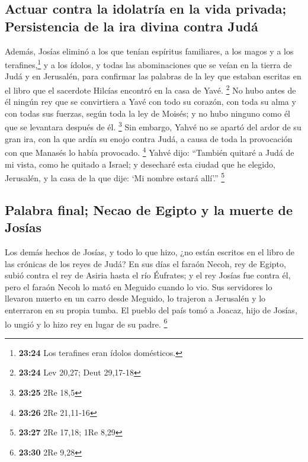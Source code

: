 \hypertarget{actuar-contra-la-idolatruxeda-en-la-vida-privada-persistencia-de-la-ira-divina-contra-juduxe1}{%
\subsection{Actuar contra la idolatría en la vida privada; Persistencia
de la ira divina contra
Judá}\label{actuar-contra-la-idolatruxeda-en-la-vida-privada-persistencia-de-la-ira-divina-contra-juduxe1}}

 Además, Josías eliminó a los que tenían espíritus
familiares, a los magos y a los terafines,\footnote{\textbf{23:24} Los
  terafines eran ídolos domésticos.} y a los ídolos, y todas las
abominaciones que se veían en la tierra de Judá y en Jerusalén, para
confirmar las palabras de la ley que estaban escritas en el libro que el
sacerdote Hilcías encontró en la casa de Yavé. \footnote{\textbf{23:24}
  Lev 20,27; Deut 29,17-18}  No hubo antes de él ningún
rey que se convirtiera a Yavé con todo su corazón, con toda su alma y
con todas sus fuerzas, según toda la ley de Moisés; y no hubo ninguno
como él que se levantara después de él. \footnote{\textbf{23:25} 2Re
  18,5}  Sin embargo, Yahvé no se apartó del ardor de su
gran ira, con la que ardía su enojo contra Judá, a causa de toda la
provocación con que Manasés lo había provocado. \footnote{\textbf{23:26}
  2Re 21,11-16}  Yahvé dijo: ``También quitaré a Judá de
mi vista, como he quitado a Israel; y desecharé esta ciudad que he
elegido, Jerusalén, y la casa de la que dije: `Mi nombre estará allí'.''
\footnote{\textbf{23:27} 2Re 17,18; 1Re 8,29}

\hypertarget{palabra-final-necao-de-egipto-y-la-muerte-de-josuxedas}{%
\subsection{Palabra final; Necao de Egipto y la muerte de
Josías}\label{palabra-final-necao-de-egipto-y-la-muerte-de-josuxedas}}

 Los demás hechos de Josías, y todo lo que hizo, ¿no
están escritos en el libro de las crónicas de los reyes de Judá?
 En sus días el faraón Necoh, rey de Egipto, subió contra
el rey de Asiria hasta el río Éufrates; y el rey Josías fue contra él,
pero el faraón Necoh lo mató en Meguido cuando lo vio. 
Sus servidores lo llevaron muerto en un carro desde Meguido, lo trajeron
a Jerusalén y lo enterraron en su propia tumba. El pueblo del país tomó
a Joacaz, hijo de Josías, lo ungió y lo hizo rey en lugar de su padre.
\footnote{\textbf{23:30} 2Re 9,28}

